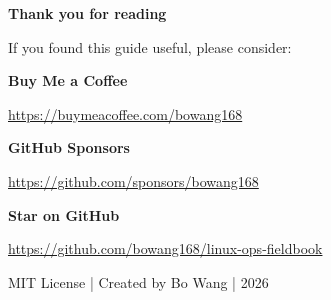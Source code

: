 \documentclass[11pt,a4paper,openany]{report}
\begin{document}
\cleardoublepage
\thispagestyle{empty}
\begin{center}
\vspace*{6cm}
{\Large\bfseries Thank you for reading}

\vspace{1cm}
{\normalsize If you found this guide useful, please consider:}

\vspace{1cm}
{\large \textcolor{linkcolor}{\textbf{Buy Me a Coffee}}}

{\normalsize \url{https://buymeacoffee.com/bowang168}}

\vspace{0.8cm}
{\large \textcolor{linkcolor}{\textbf{GitHub Sponsors}}}

{\normalsize \url{https://github.com/sponsors/bowang168}}

\vspace{0.8cm}
{\large \textcolor{linkcolor}{\textbf{Star on GitHub}}}

{\normalsize \url{https://github.com/bowang168/linux-ops-fieldbook}}

\vspace{2cm}
{\small MIT License | Created by Bo Wang | 2026}
\end{center}
\end{document}
